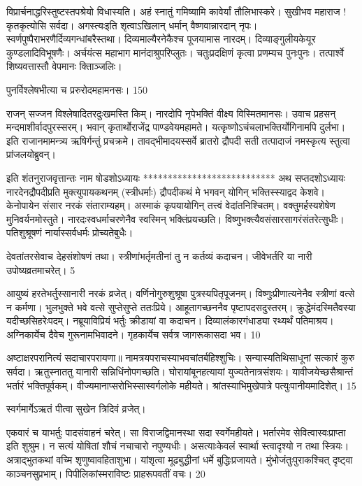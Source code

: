   विप्रार्चनाद्धरिस्तुष्टस्तपश्रेयो विधास्यति।
 अहं स्नातुं गमिष्यामि कावेर्यां तौलिभास्करे।
 सुखीभव महाराज ! कृतकृत्योसि सर्वदा।
 अगस्त्यःइति शृत्वाऽखिलान् धर्मान् वैष्णवान्नारदान् नृपः।
 स्वर्णपुष्पैराभरणैर्दिव्यगन्धांबरैस्तथा।
 दिव्यमाल्यैरनेकैश्च पूजयामास नारदम्।
 दिव्याङ्गुलीयकेयूर कुण्डलादिविभूषणैः।
 अर्चयंत्स महाभाग मानंदाश्रुपरिप्लुतः।
 चतुःप्रदक्षिणं कृत्वा प्रणम्यच पुनःपुनः।
 तत्पार्श्वे शिष्यवत्तास्तौ वेपमानः क्तिाञ्जलिः।
 
पुनर्विश्लेषभीत्या च प्ररुरोदमहामनसः।
 150

  राजन् सज्जन विश्लेषादितरदुःखमस्ति किम्।
 नारदोपि नृपेभक्तिं वीक्ष्य विस्मितमानसः।
 उवाच प्रहसन् मन्दमाशीर्वादपुरस्सरम्।
 भवान् कृतार्थोराजेंद्र पाण्डवेयमहामते।
 यत्कृष्णोऽचंचलाभक्तिर्योगिनामपि दुर्लभा।
 इति राजानमामन्त्र्य ऋषिर्गन्तुं प्रचक्रमे।
 तावद्भीमादयस्सर्वे ब्रातरो द्रौपदी सती तत्पादाजं नमस्कृत्य स्तुत्वा प्रांजलयोब्रुवन्।
 
इति शंतनुराजवृत्तान्तः नाम षोडशोऽध्यायः
***************************
अथ सप्तदशोऽध्यायः नारदेनद्रौपदीप्रति मुक्त्युपायकथनम् (स्त्रीधर्माः) द्रौपदीकथं मे भगवन् योगिन् भक्तिस्स्याद्वद केशवे।
 केनोपायेन संसार नरकं संताराम्यहम्।
 अस्माकं कृपयायोगिन् तत्त्वं वेदांतनिश्चितम्।
 वक्तुमर्हस्यशेषेण मुनिवर्यनमोस्तुते।
 नारदःस्वधर्माचरणेनैव स्वस्मिन् भक्तिंप्रयच्छति।
 विष्णुभक्त्यैवसंसारसागरंसंतरेत्सुधीः।
 पतिशुश्रूषणं नार्यास्सर्वधर्मः प्रोच्यतेबुधैः।
 
देवतांतरसेवाच देहसंशोषणं तथा।
 स्त्रीणांभर्तृमतीनां तु न कर्तव्यं कदाचन।
 जीवेभर्तरि या नारी उपोष्यव्रतमाचरेत्।
 5

  आयुष्यं हरतेभर्तुस्सानारी नरकं व्रजेत्।
 वर्णिनोगुरुशुश्रूषा पुत्रस्यपितृपूजनम्।
 विष्णुःप्रीणात्यनेनैव स्त्रीणां वत्से न कर्मणा।
 भुलभुक्ते भवे वत्से सुप्तेसुप्ते ततःप्रिये।
 आहूतागच्छननैव पृष्टापदसदुस्तरम्।
 क्रुद्धेमंदस्मितैवस्या यदीच्छसिहरेःपदम्।
 नब्रूयाविप्रियं भर्तुः क्रीडायां वा कदाचन।
 दिव्यालंकारगंधाड्या रथ्यर्थं पतिमाश्रय।
 अग्निकार्येच दैवेच गुरूनामभिवादने।
 गृहकार्येच सर्वत्र जागरूकासदा भव।
 10

  अष्टाक्षरपरानित्यं सदाचारपरायणा॥ नामत्रयपराचस्याभवचांतर्बहिश्शुचिः।
 सन्यास्यतिथिसाधूनां सत्कारं कुरु सर्वदा।
 ऋतुस्नाततु यानारी सन्निधिंनोपगच्छति।
 घोरायांबूनहत्यायां युज्यतेनात्रसंशयः।
 यावीजयेच्छसैश्रान्तं भर्तारं भक्तिपूर्वकम्।
 वीज्यमानाप्सरोभिस्सास्वर्गलोके महीयते।
 श्रांतस्याभिमुखेपात्रे पत्युःपानीयमादिशेत्।
 15

  स्वर्गमार्गेऽऋतं पीत्वा सुखेन त्रिदिवं व्रजेत्।
 
एकवारं च याभर्तुः पादसंवाहनं चरेत्।
 सा विराजद्विमानस्था सदा स्वर्गेमहीयते।
 भर्तारमेव सेवित्वास्वःप्राप्ता इति शुश्रुम।
 न सत्यं योषितां शौचं नचाचारो नपुण्यधीः।
 असत्याःकेवलं स्वार्था स्त्वादृश्यो न तथा स्त्रियः।
 अत्राद्भुतकथां वच्मि शृणुष्वावहिताशुभा।
 यांशृत्वा मूढबुद्धीनां धर्मे बुद्धिःप्रजायते।
 मुंभोजंतुःपुराकश्चित् दृष्ट्वा काञ्चनसुप्रभाम्।
 पिपीलिकांस्मराविष्टः प्राहरूपवतीं वचः।
 20

